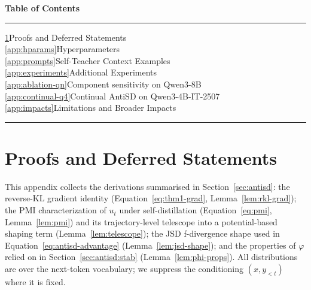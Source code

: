 \documentclass{article}
\begin{document}
\noindent\textbf{Table of Contents}
\vspace{0.3em}
\hrule
\vspace{0.5em}
\noindent
\hyperref[app:proofs]{\ref{app:proofs}}\hspace{1em}Proofs and Deferred Statements\dotfill\pageref{app:proofs}\\[0.3em]
\hyperref[app:hparams]{\ref{app:hparams}}\hspace{1em}Hyperparameters\dotfill\pageref{app:hparams}\\[0.3em]
\hyperref[app:prompts]{\ref{app:prompts}}\hspace{1em}Self-Teacher Context Examples\dotfill\pageref{app:prompts}\\[0.3em]
\hyperref[app:experiments]{\ref{app:experiments}}\hspace{1em}Additional Experiments\dotfill\pageref{app:experiments}\\[0.3em]
\hspace*{1.5em}\hyperref[app:ablation-qn]{\ref{app:ablation-qn}}\hspace{1em}Component sensitivity on Qwen3-8B\dotfill\pageref{app:ablation-qn}\\[0.3em]
\hspace*{1.5em}\hyperref[app:continual-q4]{\ref{app:continual-q4}}\hspace{1em}Continual AntiSD on Qwen3-4B-IT-2507\dotfill\pageref{app:continual-q4}\\[0.3em]
\hyperref[app:impacts]{\ref{app:impacts}}\hspace{1em}Limitations and Broader Impacts\dotfill\pageref{app:impacts}
\vspace{0.5em}
\hrule
\vspace{1.5em}

\section{Proofs and Deferred Statements}
\label{app:proofs}

This appendix collects the derivations summarised in Section~\ref{sec:antisd}: the reverse-KL gradient identity (Equation~\eqref{eq:thm1-grad}, Lemma~\ref{lem:rkl-grad}); the PMI characterization of $u_t$ under self-distillation (Equation~\eqref{eq:pmi}, Lemma~\ref{lem:pmi}) and its trajectory-level telescope into a potential-based shaping term (Lemma~\ref{lem:telescope}); the JSD f-divergence shape used in Equation~\eqref{eq:antisd-advantage} (Lemma~\ref{lem:jsd-shape}); and the properties of $\varphi$ relied on in Section~\ref{sec:antisd:stab} (Lemma~\ref{lem:phi-props}). All distributions are over the next-token vocabulary; we suppress the conditioning $(x, y_{<t})$ where it is fixed.
\end{document}
